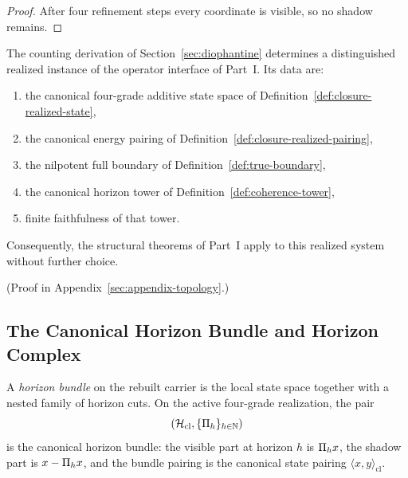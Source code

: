 \begin{proof}
After four refinement steps every coordinate is visible, so no shadow remains.
\end{proof}

\begin{theorem}
\label{thm:closure-balance-realizes-interface}
The counting derivation of Section~\ref{sec:diophantine} determines a
distinguished realized instance of the operator interface of Part~I. Its data
are:
\begin{enumerate}[label=(\roman*), itemsep=0.2em]
\item the canonical four-grade additive state space of Definition~\ref{def:closure-realized-state},
\item the canonical energy pairing of Definition~\ref{def:closure-realized-pairing},
\item the nilpotent full boundary of Definition~\ref{def:true-boundary},
\item the canonical horizon tower of Definition~\ref{def:coherence-tower},
\item finite faithfulness of that tower.
\end{enumerate}
Consequently, the structural theorems of Part~I apply to this realized system
without further choice.
\end{theorem}

(Proof in Appendix~\ref{sec:appendix-topology}.)

\subsection{The Canonical Horizon Bundle and Horizon Complex}

\begin{definition}
\label{def:horizon-bundle}
A \emph{horizon bundle} on the rebuilt carrier is the local state space together
with a nested family of horizon cuts. On the active four-grade realization, the
pair
\[
(\mathcal{H}_{\mathrm{cl}},\{\Pi_{h}\}_{h\in\mathbb{N}})
\]
is the canonical horizon bundle: the visible part at horizon \(h\) is
\(\Pi_{h}x\), the shadow part is \(x-\Pi_{h}x\), and the bundle pairing is
the canonical state pairing \(\langle x,y\rangle_{\mathrm{cl}}\).
\end{definition}


